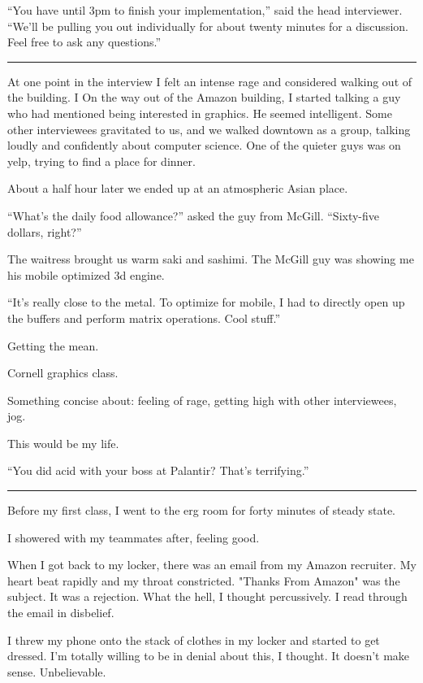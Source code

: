 ``You have until 3pm to finish your implementation,'' said the head interviewer.
``We'll be pulling you out individually for about twenty minutes for a
discussion.  Feel free to ask any questions.''

\plainfancybreak{12pt}{2}{* * *}

At one point in the interview I felt an intense rage and considered walking out
of the building.  I
On the way out of the Amazon building, I started talking a guy who had mentioned
being interested in graphics.  He seemed intelligent.  Some other interviewees
gravitated to us, and we walked downtown as a group, talking loudly and
confidently about computer science.  One of the quieter guys was on yelp, trying
to find a place for dinner.

About a half hour later we ended up at an atmospheric Asian place.

``What's the daily food allowance?'' asked the guy from McGill. ``Sixty-five
dollars, right?''

The waitress brought us warm saki and sashimi.  The McGill guy was showing me
his mobile optimized 3d engine.

``It's really close to the metal.  To optimize for mobile, I had to directly
open up the buffers and perform matrix operations.  Cool stuff.''

Getting the mean.

Cornell graphics class.

Something concise about: feeling of rage, getting high with other interviewees, jog.

This would be my life.

``You did acid with your boss at Palantir?  That's terrifying.''

\plainfancybreak{12pt}{2}{* * *}

Before my first class, I went to the erg room for forty minutes of steady state.

I showered with my teammates after, feeling good.

When I got back to my locker, there was an email from my Amazon recruiter.  My
heart beat rapidly and my throat constricted.  "Thanks From Amazon" was the
subject.  It was a rejection.  What the hell, I thought percussively.  I read
through the email in disbelief.

I threw my phone onto the stack of clothes in my locker and started to get
dressed.  I'm totally willing to be in denial about this, I thought.  It doesn't
make sense.  Unbelievable.

